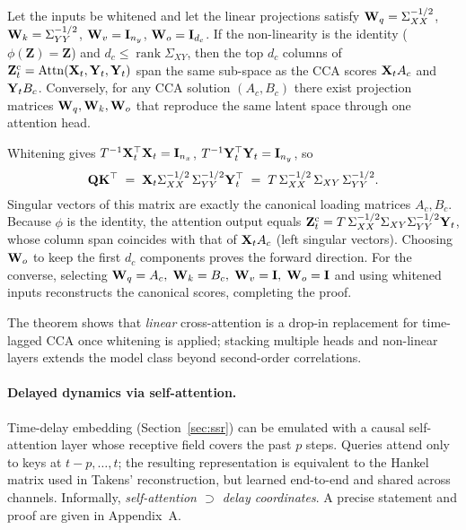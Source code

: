 \documentclass[14pt]{extarticle}
\begin{document}
	\begin{theorem}
		\label{thm:attn_cca}
		Let the inputs be whitened and let the linear projections satisfy
		\(\mathbf{W}_q=\Sigma_{XX}^{-1/2}\),
		\(\mathbf{W}_k=\Sigma_{YY}^{-1/2}\),
		\(\mathbf{W}_v=\mathbf{I}_{n_y}\),
		\(\mathbf{W}_o=\mathbf{I}_{d_c}\).
		If the non-linearity is the identity
		(\(\phi(\mathbf Z)=\mathbf Z\)) and \(d_c\le\operatorname{rank}\Sigma_{XY}\),
		then the top \(d_c\) columns of
		\(\mathbf{Z}_t^{\mathrm c} = \operatorname{Attn}(\mathbf{X}_t,\mathbf{Y}_t,\mathbf{Y}_t)\)
		span the same sub-space as the CCA scores
		\(\mathbf{X}_tA_c\) and \(\mathbf{Y}_tB_c\).
		Conversely, for any CCA solution \((A_c,B_c)\) there exist projection
		matrices \(\mathbf{W}_q,\mathbf{W}_k,\mathbf{W}_o\) that reproduce the same latent space
		through one attention head.
	\end{theorem}
	
	\begin{Proof}
		Whitening gives
		\(T^{-1}\mathbf{X}_t^\top\mathbf{X}_t=\mathbf{I}_{n_x}\),
		\(T^{-1}\mathbf{Y}_t^\top\mathbf{Y}_t=\mathbf{I}_{n_y}\),
		so
		\[
		\mathbf{Q}\mathbf{K}^\top \;=\;
		\mathbf{X}_t\Sigma_{XX}^{-1/2}\,\Sigma_{YY}^{-1/2}\mathbf{Y}_t^\top
		\;=\;T\,\Sigma_{XX}^{-1/2}\,\Sigma_{XY}\,\Sigma_{YY}^{-1/2}.
		\]
		Singular vectors of this matrix are exactly the canonical loading
		matrices \(A_c,B_c\).
		Because \(\phi\) is the identity, the attention output equals
		\(\mathbf{Z}_t^{\mathrm c}=T\,\Sigma_{XX}^{-1/2}\Sigma_{XY}\Sigma_{YY}^{-1/2}\mathbf{Y}_t\),
		whose column span coincides with that of
		\(\mathbf{X}_tA_c\) (left singular vectors).
		Choosing \(\mathbf{W}_o\) to keep the first \(d_c\) components proves the forward
		direction.
		For the converse, selecting
		\(\mathbf{W}_q=A_c,\;\mathbf{W}_k=B_c,\;\mathbf{W}_v=\mathbf{I},\;\mathbf{W}_o=\mathbf{I}\)
		and using whitened inputs reconstructs the canonical scores, completing
		the proof.
	\end{Proof}
	
	The theorem shows that \emph{linear} cross-attention is a drop-in
	replacement for time-lagged CCA once whitening is applied; stacking
	multiple heads and non-linear layers extends the model class beyond
	second-order correlations.
	
	\paragraph{Delayed dynamics via self-attention.}
	Time-delay embedding (Section~\ref{sec:ssr}) can be emulated with a causal
	self-attention layer whose receptive field covers the past
	$p$ steps.
	Queries attend only to keys at \(t-p,\dots,t\); the resulting representation
	is equivalent to the Hankel matrix used in Takens’ reconstruction,
	but learned end-to-end and shared across channels.
	Informally, \emph{self-attention \(\supset\) delay coordinates}.
	A precise statement and proof are given in Appendix~A.
	
\end{document}
